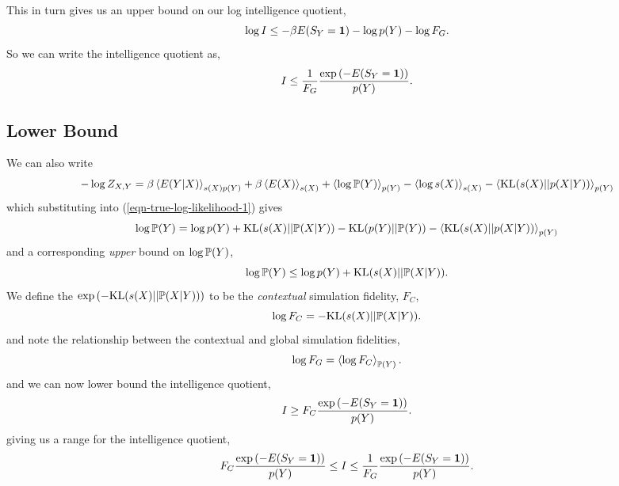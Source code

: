 \documentclass[]{article}
\begin{document}
This in turn gives us an upper bound on our log intelligence quotient,
\[
\log I \leq -\beta E(S_Y = \textbf{1})
-\log p(Y) - \log F_G.
\]
So we can write the intelligence quotient as,
\[
I \leq
\frac{1}{F_G}\frac{\exp\left(-E(S_Y=\textbf{1})\right)}{p(Y)}.
\]

\subsection{Lower Bound}

We can also write
\[
- \log Z_{X,Y} =
\beta\left\langle E(Y |
  X) \right\rangle_{s(X)p(Y)}
+ \beta\left\langle E(X) \right\rangle_{s(X )} +
\left\langle \log \mathbb{P}(Y) \right\rangle_{p(Y)}
-\left\langle \log s(X) \right\rangle_{s(X)} -
\left\langle \text{KL}(s(X) ||
  p(X |
  Y)) \right\rangle_{p(Y)}
\]
which substituting into (\ref{eqn-true-log-likelihood-1}) gives
\[
\log \mathbb{P}(Y) = \log p(Y) +
\text{KL}(s(X)||\mathbb{P}(X|Y))
- \text{KL}(p(Y) || \mathbb{P}(Y))
- \left\langle \text{KL}(s(X) ||
  p(X |
  Y)) \right\rangle_{p(Y)}
\]
and a corresponding \emph{upper} bound on $\log \mathbb{P}(Y)$, 
\[
\log \mathbb{P}(Y) \leq \log p(Y)
+
\text{KL}(s(X)||\mathbb{P}(X|Y)).
\]
We define the $\exp\left(-
\text{KL}(s(X)||\mathbb{P}(X|Y))\right)$
to be the \emph{contextual} simulation fidelity, $F_C$,
\[
\log F_C =
-\text{KL}(s(X)||\mathbb{P}(X|Y)).
\]
and note the relationship between the contextual and global simulation
fidelities,
\[
\log F_G = \left\langle \log F_C \right\rangle_{\mathbb{P}(Y)}.
\]
and we can now lower bound the intelligence quotient,
\[
I \geq F_C \frac{\exp\left(-E(S_Y=
  \textbf{1})\right)}{p(Y)}.
\]
giving us a range for the intelligence quotient,
\[
F_C \frac{\exp\left(-E(S_Y=
  \textbf{1})\right)}{p(Y)} \leq I \leq
\frac{1}{F_G}\frac{\exp\left(-E(S_Y=
  \textbf{1})\right)}{p(Y)}.
\]
\end{document}
